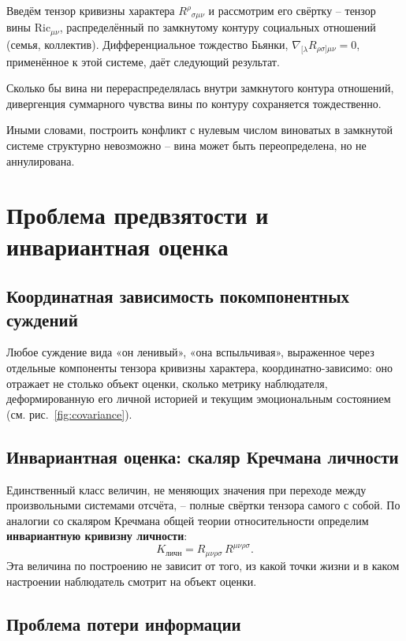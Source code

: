 \documentclass[11pt,a4paper]{article}
\begin{document}
Введём тензор кривизны характера $R^{\rho}{}_{\sigma\mu\nu}$ и рассмотрим его свёртку -- тензор вины $\mathrm{Ric}_{\mu\nu}$, распределённый по замкнутому контуру социальных отношений (семья, коллектив). Дифференциальное тождество Бьянки, $\nabla_{[\lambda}R_{\rho\sigma]\mu\nu}=0$, применённое к этой системе, даёт следующий результат.

\begin{theorem}
Сколько бы вина ни перераспределялась внутри замкнутого контура отношений, дивергенция суммарного чувства вины по контуру сохраняется тождественно.
\end{theorem}

Иными словами, построить конфликт с нулевым числом виноватых в замкнутой системе структурно невозможно -- вина может быть переопределена, но не аннулирована.

\section{Проблема предвзятости и инвариантная оценка}

\subsection{Координатная зависимость покомпонентных суждений}

Любое суждение вида «он ленивый», «она вспыльчивая», выраженное через отдельные компоненты тензора кривизны характера, координатно-зависимо: оно отражает не столько объект оценки, сколько метрику наблюдателя, деформированную его личной историей и текущим эмоциональным состоянием (см. рис.~\ref{fig:covariance}).

\subsection{Инвариантная оценка: скаляр Кречмана личности}

Единственный класс величин, не меняющих значения при переходе между произвольными системами отсчёта, -- полные свёртки тензора самого с собой. По аналогии со скаляром Кречмана общей теории относительности определим \textbf{инвариантную кривизну личности}:
\[
K_{\text{личн}} = R_{\mu\nu\rho\sigma}\,R^{\mu\nu\rho\sigma}.
\]
Эта величина по построению не зависит от того, из какой точки жизни и в каком настроении наблюдатель смотрит на объект оценки.

\subsection{Проблема потери информации}
\end{document}

